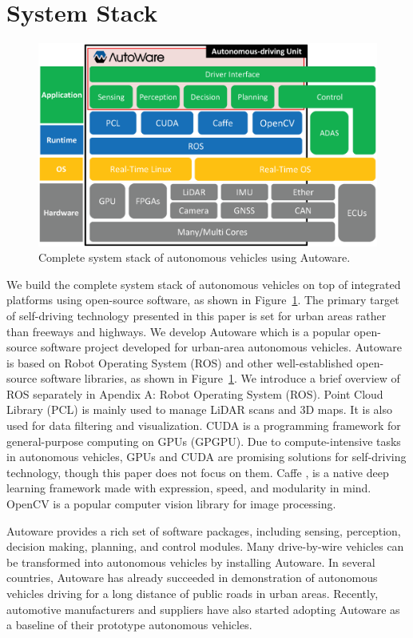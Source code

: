 \section{System Stack}

\begin{figure}[!htbp]
  \centering
  \includegraphics[width=0.9\linewidth]{../figure/Autoware/system_stack.eps}
  \caption{\label{fig:system_stack}
  Complete system stack of autonomous vehicles using Autoware.}
\end{figure}

We build the complete system stack of autonomous vehicles on top of
integrated platforms using open-source software, as shown in
Figure~\ref{fig:system_stack}.
The primary target of self-driving technology presented in this paper is
 set for urban areas rather than freeways and highways.
We develop Autoware which is a popular
open-source software project developed for urban-area autonomous
vehicles.
Autoware is based on Robot Operating System (ROS) and other
well-established open-source software libraries, as shown in
Figure~\ref{fig:system_stack}.
We introduce a brief overview of ROS separately in Apendix A: Robot Operating System (ROS).
Point Cloud Library (PCL) \cite{pcl} is mainly used to manage LiDAR
scans and 3D maps.
It is also used for data filtering and visualization.
CUDA \cite{cuda} is a programming framework for general-purpose
computing on GPUs (GPGPU).
Due to compute-intensive tasks in autonomous vehicles, GPUs and CUDA are
promising solutions for self-driving technology, though this paper does
not focus on them.
Caffe \cite{jia2014caffe}, \cite{caffe} is a native deep learning
framework made with expression, speed, and modularity in mind.
OpenCV \cite{opencv} is a popular computer vision library for image
processing.

Autoware provides a rich set of software packages, including sensing,
perception, decision making, planning, and control modules.
Many drive-by-wire vehicles can be transformed into autonomous vehicles
by installing Autoware.
In several countries, Autoware has already succeeded in demonstration of
autonomous vehicles driving for a long distance of public roads in urban
areas. 
Recently, automotive manufacturers and suppliers have also started
adopting Autoware as a baseline of their prototype autonomous vehicles.

